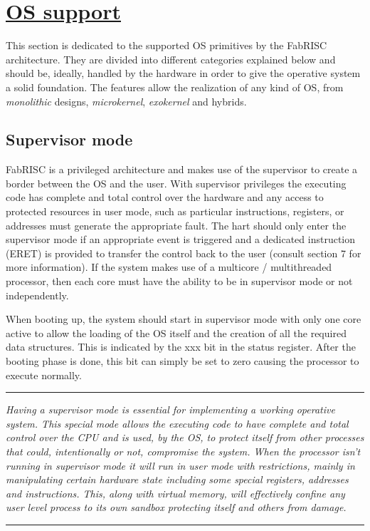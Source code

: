 \section[OS support]{\LARGE\underline{OS support}} %

    \vspace{10pt}

    This section is dedicated to the supported OS primitives by the FabRISC architecture. They are divided into different categories explained below and should be, ideally, handled by the hardware in order to give the operative system a solid foundation. The features allow the realization of any kind of OS, from \textit{monolithic} designs, \textit{microkernel}, \textit{exokernel} and hybrids.

    \subsection{Supervisor mode}

        \vspace{10pt}

        FabRISC is a privileged architecture and makes use of the supervisor to create a border between the OS and the user. With supervisor privileges the executing code has complete and total control over the hardware and any access to protected resources in user mode, such as particular instructions, registers, or addresses must generate the appropriate fault. The hart should only enter the supervisor mode if an appropriate event is triggered and a dedicated instruction (ERET) is provided to transfer the control back to the user (consult section 7 for more information). If the system makes use of a multicore / multithreaded processor, then each core must have the ability to be in supervisor mode or not independently.

        \vspace{10pt}

        When booting up, the system should start in supervisor mode with only one core active to allow the loading of the OS itself and the creation of all the required data structures. This is indicated by the xxx bit in the status register. After the booting phase is done, this bit can simply be set to zero causing the processor to execute normally.

    \par\noindent\rule{\textwidth}{0.4pt}
    \textit{Having a supervisor mode is essential for implementing a working operative system. This special mode allows the executing code to have complete and total control over the CPU and is used, by the OS, to protect itself from other processes that could, intentionally or not, compromise the system. When the processor isn't running in supervisor mode it will run in user mode with restrictions, mainly in manipulating certain hardware state including some special registers, addresses and instructions. This, along with virtual memory, will effectively confine any user level process to its own sandbox protecting itself and others from damage.}
    \par\noindent\rule{\textwidth}{0.4pt}

